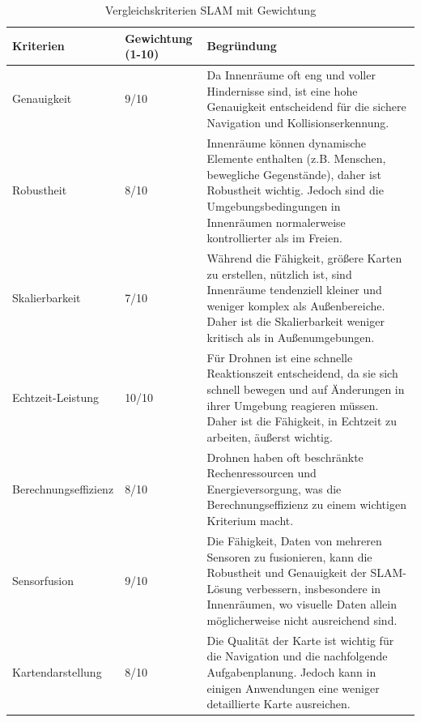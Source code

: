 \begin{table}
    \begin{center}
        \begin{tabular}{|p{4cm}|p{1.5cm}|p{10cm}|}
            \hline
             Kriterien & Gewich\-tung (1-10) & Begründung \\\hline
             Genauigkeit & 9/10 & Da Innenräume oft eng und voller Hindernisse sind, ist eine hohe Genauigkeit entscheidend für die sichere Navigation und Kollisionserkennung. \\\hline
             Robustheit & 8/10 & Innenräume können dynamische Elemente enthalten (z.B. Menschen, bewegliche Gegenstände), daher ist Robustheit wichtig. Jedoch sind die Umgebungsbedingungen in Innenräumen normalerweise kontrollierter als im Freien. \\\hline
             Skalierbarkeit & 7/10 & Während die Fähigkeit, größere Karten zu erstellen, nützlich ist, sind Innenräume tendenziell kleiner und weniger komplex als Außenbereiche. Daher ist die Skalierbarkeit weniger kritisch als in Außenumgebungen.\\\hline
             Echtzeit-Leistung & 10/10 & Für Drohnen ist eine schnelle Reaktionszeit entscheidend, da sie sich schnell bewegen und auf Änderungen in ihrer Umgebung reagieren müssen. Daher ist die Fähigkeit, in Echtzeit zu arbeiten, äußerst wichtig.\\\hline
             Berechnungseffizienz & 8/10 & Drohnen haben oft beschränkte Rechenressourcen und Energieversorgung, was die Berechnungseffizienz zu einem wichtigen Kriterium macht. \\\hline
             Sensorfusion & 9/10 & Die Fähigkeit, Daten von mehreren Sensoren zu fusionieren, kann die Robustheit und Genauigkeit der SLAM-Lösung verbessern, insbesondere in Innenräumen, wo visuelle Daten allein möglicherweise nicht ausreichend sind. \\\hline
             Kartendarstellung & 8/10 & Die Qualität der Karte ist wichtig für die Navigation und die nachfolgende Aufgabenplanung. Jedoch kann in einigen Anwendungen eine weniger detaillierte Karte ausreichen. \\
             \hline
        \end{tabular}
        \caption{Vergleichskriterien \ac{SLAM} mit Gewichtung}\label{tab:vergleich-slam-gewichtung}
    \end{center}
\end{table}

